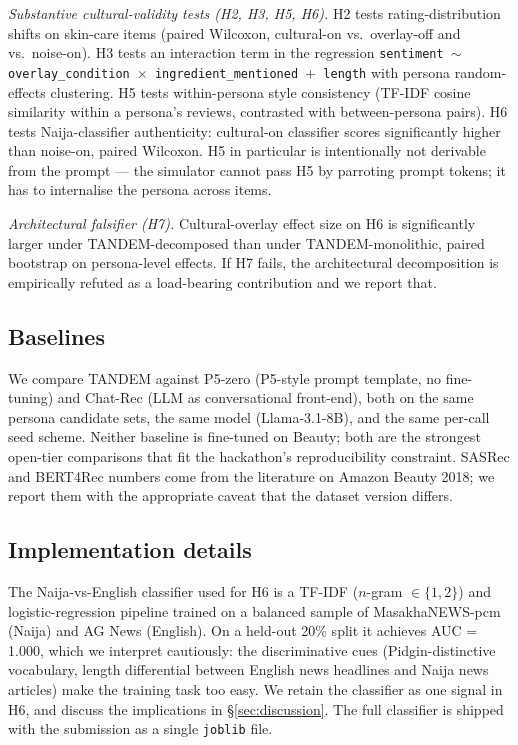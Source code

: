 \documentclass[8pt,twocolumn,a4paper]{extarticle}
\begin{document}
\textit{Substantive cultural-validity tests (H2, H3, H5, H6).} H2 tests rating-distribution shifts on skin-care items (paired Wilcoxon, cultural-on vs.\ overlay-off and vs.\ noise-on). H3 tests an interaction term in the regression \texttt{sentiment $\sim$ overlay\_condition $\times$ ingredient\_mentioned $+$ length} with persona random-effects clustering. H5 tests within-persona style consistency (TF-IDF cosine similarity within a persona's reviews, contrasted with between-persona pairs). H6 tests Naija-classifier authenticity: cultural-on classifier scores significantly higher than noise-on, paired Wilcoxon. H5 in particular is intentionally not derivable from the prompt --- the simulator cannot pass H5 by parroting prompt tokens; it has to internalise the persona across items.

\textit{Architectural falsifier (H7).} Cultural-overlay effect size on H6 is significantly larger under TANDEM-decomposed than under TANDEM-monolithic, paired bootstrap on persona-level effects. If H7 fails, the architectural decomposition is empirically refuted as a load-bearing contribution and we report that.

\subsection{Baselines}

We compare TANDEM against P5-zero (P5-style prompt template, no fine-tuning) and Chat-Rec (LLM as conversational front-end), both on the same persona candidate sets, the same model (Llama-3.1-8B), and the same per-call seed scheme. Neither baseline is fine-tuned on Beauty; both are the strongest open-tier comparisons that fit the hackathon's reproducibility constraint. SASRec and BERT4Rec numbers come from the literature on Amazon Beauty 2018; we report them with the appropriate caveat that the dataset version differs.

\subsection{Implementation details}

The Naija-vs-English classifier used for H6 is a TF-IDF ($n$-gram $\in \{1,2\}$) and logistic-regression pipeline trained on a balanced sample of MasakhaNEWS-pcm~\citep{adelani2023masakhanews} (Naija) and AG News (English). On a held-out 20\% split it achieves AUC = 1.000, which we interpret cautiously: the discriminative cues (Pidgin-distinctive vocabulary, length differential between English news headlines and Naija news articles) make the training task too easy. We retain the classifier as one signal in H6, and discuss the implications in \S\ref{sec:discussion}. The full classifier is shipped with the submission as a single \texttt{joblib} file.
\end{document}
